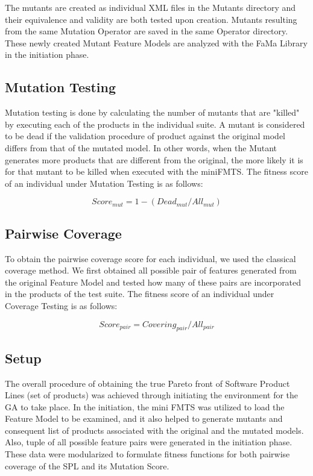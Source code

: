 \documentclass[a4paper,12pt]{article}
\begin{document}
The mutants are created as individual XML files in the Mutants directory and their equivalence and validity are both tested upon creation. Mutants resulting from the same Mutation Operator are saved in the same Operator directory. These newly created Mutant Feature Models are analyzed with the FaMa Library in the initiation phase.

\subsection{Mutation Testing}
Mutation testing is done by calculating the number of mutants that are "killed" by executing each of the products in the individual suite. A mutant is considered to be dead if the validation procedure of product against the original model differs from that of the mutated model. In other words, when the Mutant generates more products that are different from the original, the more likely it is for that mutant to be killed when executed with the miniFMTS. The fitness score of an individual under Mutation Testing is as follows:

\begin{equation}
Score_{mut} = 1- ( Dead_{mut} / All_{mut})
\end{equation}

\subsection{Pairwise Coverage}
To obtain the pairwise coverage score for each individual, we used the classical coverage method. We first obtained all possible pair of features generated from the original Feature Model and tested how many of these pairs are incorporated in the products of the test suite. The fitness score of an individual under Coverage Testing is as follows:

\begin{equation}
Score_{pair} = Covering_{pair} / All_{pair}
\end{equation}





\subsection{Setup}
The overall procedure of obtaining the true Pareto front of Software Product Lines (set of products) was achieved through initiating the environment for the GA to take place. In the initiation, the mini FMTS was utilized to load the Feature Model to be examined, and it also helped to generate mutants and consequent list of products associated with the original and the mutated models. Also, tuple of all possible feature pairs were generated in the initiation phase. These data were modularized to formulate fitness functions for both pairwise coverage of the SPL and its Mutation Score. 
\end{document}

